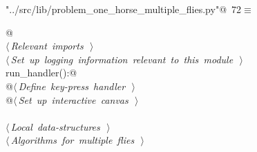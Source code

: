 \documentclass[11.5pt]{report}
\begin{document}
\begin{flushleft} \small\label{scrap99}\raggedright\small
{} \verb@"../src/lib/problem_one_horse_multiple_flies.py"@\nobreak\ {\footnotesize {72}}$\equiv$
\vspace{-1ex}
\begin{list}{}{} \item
\mbox{}\verb@    @\\
\mbox{}\verb@@\hbox{$\langle\,${\itshape Relevant imports}\nobreak\ {\footnotesize {}}$\,\rangle$}\verb@@\\
\mbox{}\verb@@\hbox{$\langle\,${\itshape Set up logging information relevant to this module}\nobreak\ {\footnotesize {}}$\,\rangle$}\verb@@\\
\mbox{}\verb@def run_handler():@\\
\mbox{}\verb@    @\hbox{$\langle\,${\itshape Define key-press handler}\nobreak\ {\footnotesize {}}$\,\rangle$}\verb@@\\
\mbox{}\verb@    @\hbox{$\langle\,${\itshape Set up interactive canvas}\nobreak\ {\footnotesize {}}$\,\rangle$}\verb@@\\
\mbox{}\verb@@\\
\mbox{}\verb@@\hbox{$\langle\,${\itshape Local data-structures}\nobreak\ {\footnotesize {}}$\,\rangle$}\verb@@\\
\mbox{}\verb@@\hbox{$\langle\,${\itshape Algorithms for multiple flies}\nobreak\ {\footnotesize {}}$\,\rangle$}\verb@@\\
\mbox{}\verb@@{\NWsep}
\end{list}
\vspace{-1.5ex}
\footnotesize
\begin{list}{}{\setlength{\itemsep}{-\parsep}\setlength{\itemindent}{-\leftmargin}}

\item{}
\end{list}
\vspace{4ex}
\end{flushleft}


\newpage
\end{document}
